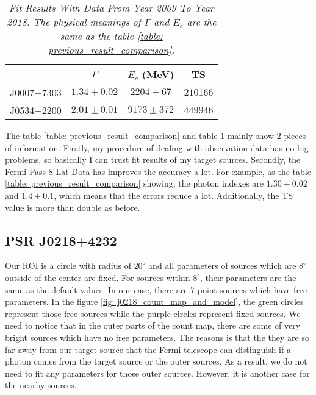\documentclass[12pt]{report}
\newcommand{\mycaption}[1]{\caption{\textit{\footnotesize #1}}}
\begin{document}
            \begin{table}[!ht]
              \centering
              \begin{tabular}{|c|c|c|c|}
                \hline 
                &$\Gamma$& $E_c$ (MeV) & TS \\ \hline 
                J0007+7303 & $1.34\pm0.02$ & $2204\pm67$ & $210166$ \\ \hline 
                J0534+2200 & $2.01\pm0.01$ & $9173\pm372$ & $449946$ \\ \hline
              \end{tabular}
              \mycaption{Fit Results With Data From Year 2009 To Year 2018. The physical meanings of 
              $\Gamma$ and $E_c$ are the same as the table \ref{table: previous_result_comparison}.}
              \label{table: 2018_fit_data}
            \end{table}
            \vspace{1cm}            
            The table \ref{table: previous_result_comparison} and table \ref{table: 2018_fit_data} mainly 
            show 2 pieces of information. Firstly, my procedure of dealing with observation data has no
            big problems, so basically I can trust fit results of my target sources. Secondly, the Fermi 
            Pass 8 Lat Data has improves the accuracy a lot. For example, as the table 
            \ref{table: previous_result_comparison} showing, the photon indexes are 
            $1.30\pm0.02$ and $1.4\pm0.1$, which means that the errors reduce a lot. Additionally, the TS 
            value is more than double as before. 


        \subsection{PSR J0218+4232}
          \label{j0218}
          Our ROI is a circle with radius of $20^\circ$ and all parameters of sources which are $8^\circ$ outside 
          of the center are fixed. For sources within $8^\circ$, their parameters are the same as the default values. 
          In our case, there are 7 point sources which have free parameters. In the figure 
          \ref{fig: j0218_count_map_and_model}, the green circles represent those free sources while the purple circles 
          represent fixed sources. We need to notice that in the outer parts of the count map, there are some of very 
          bright sources which have no free parameters. The reasons is that the they are so far away from our target source
          that the Fermi telescope can distinguish if a photon comes from the target source or the outer sources.
          As a result, we do not need to fit any parameters for those outer sources. 
          However, it is another case for the nearby sources. 
          
\end{document}
